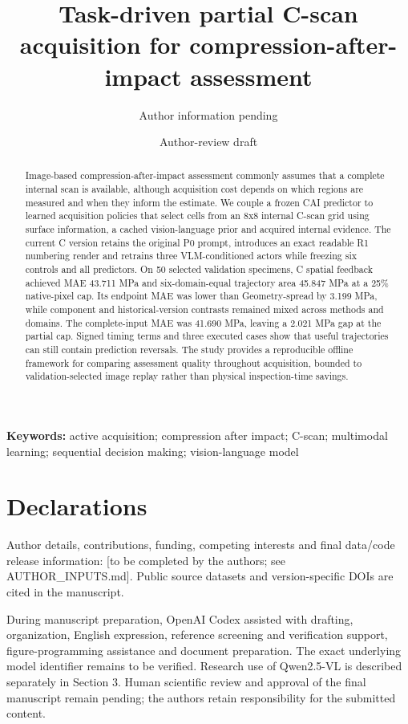 \documentclass[11pt,a4paper]{article}
\title{Task-driven partial C-scan acquisition for compression-after-impact assessment}
\author{Author information pending}
\date{Author-review draft}
\begin{document}
\maketitle
\begin{abstract}
Image-based compression-after-impact assessment commonly assumes that a complete internal scan is available, although acquisition cost depends on which regions are measured and when they inform the estimate. We couple a frozen CAI predictor to learned acquisition policies that select cells from an 8x8 internal C-scan grid using surface information, a cached vision-language prior and acquired internal evidence. The current C version retains the original P0 prompt, introduces an exact readable R1 numbering render and retrains three VLM-conditioned actors while freezing six controls and all predictors. On 50 selected validation specimens, C spatial feedback achieved MAE 43.711 MPa and six-domain-equal trajectory area 45.847 MPa at a 25\% native-pixel cap. Its endpoint MAE was lower than Geometry-spread by 3.199 MPa, while component and historical-version contrasts remained mixed across methods and domains. The complete-input MAE was 41.690 MPa, leaving a 2.021 MPa gap at the partial cap. Signed timing terms and three executed cases show that useful trajectories can still contain prediction reversals. The study provides a reproducible offline framework for comparing assessment quality throughout acquisition, bounded to validation-selected image replay rather than physical inspection-time savings.
\end{abstract}
\textbf{Keywords:} active acquisition; compression after impact; C-scan; multimodal learning; sequential decision making; vision-language model






\hypertarget{declarations}{%
\section{Declarations}\label{declarations}}

Author details, contributions, funding, competing interests and final data/code release information: {[}to be completed by the authors; see AUTHOR\_INPUTS.md{]}. Public source datasets and version-specific DOIs are cited in the manuscript.

During manuscript preparation, OpenAI Codex assisted with drafting, organization, English expression, reference screening and verification support, figure-programming assistance and document preparation. The exact underlying model identifier remains to be verified. Research use of Qwen2.5-VL is described separately in Section 3. Human scientific review and approval of the final manuscript remain pending; the authors retain responsibility for the submitted content.



\end{document}
